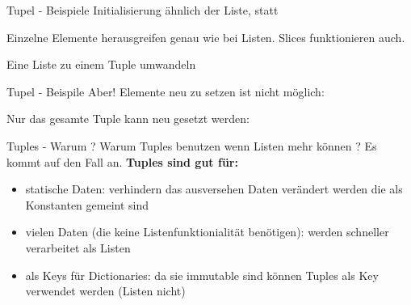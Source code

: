 \begin{frame}{Tupel - Beispiele}
	Initialisierung ähnlich der Liste, \codeline{()} statt \codeline{[]}
	
	\pause
	Einzelne Elemente herausgreifen genau wie bei Listen. Slices funktionieren auch.
	
	\pause
	Eine Liste zu einem Tuple umwandeln
	
\end{frame}
\begin{frame}{Tupel - Beispile}
	Aber! Elemente neu zu setzen ist nicht möglich:
	
	\pause
	Nur das gesamte Tuple kann neu gesetzt werden:
	
\end{frame}

\begin{frame}{Tuples - Warum ?}
	Warum Tuples benutzen wenn Listen mehr können ? Es kommt auf den Fall an.
	\linebreak\linebreak
	\textbf{Tuples sind gut für:}
	\begin{itemize}
		\pause
		\item statische Daten: verhindern das ausversehen Daten verändert werden die als Konstanten gemeint sind
		\pause
		\item vielen Daten (die keine Listenfunktionialität benötigen): werden schneller verarbeitet als Listen
		\pause
		\item als Keys für Dictionaries: da sie immutable sind können Tuples als Key verwendet werden (Listen nicht)
	\end{itemize}
\end{frame}	

